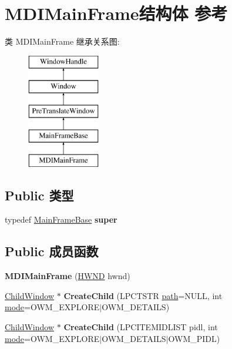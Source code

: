 \hypertarget{struct_m_d_i_main_frame}{}\section{M\+D\+I\+Main\+Frame结构体 参考}
\label{struct_m_d_i_main_frame}
类 M\+D\+I\+Main\+Frame 继承关系图\+:\begin{figure}[H]
\begin{center}
\leavevmode
\includegraphics[height=5.000000cm]{struct_m_d_i_main_frame}
\end{center}
\end{figure}
\subsection*{Public 类型}
\begin{DoxyCompactItemize}
\item 
\mbox{\label{struct_m_d_i_main_frame_ad071b28486f4e0756b0119e080d413d4}} 
typedef \hyperlink{struct_main_frame_base}{Main\+Frame\+Base} {\bfseries super}
\end{DoxyCompactItemize}
\subsection*{Public 成员函数}
\begin{DoxyCompactItemize}
\item 
\mbox{\label{struct_m_d_i_main_frame_af79d083a43b136dad05247039bc7c5e0}} 
{\bfseries M\+D\+I\+Main\+Frame} (\hyperlink{interfacevoid}{H\+W\+ND} hwnd)
\item 
\mbox{\label{struct_m_d_i_main_frame_acad505b5e3eea735699089e0fefae286}} 
\hyperlink{struct_child_window}{Child\+Window} $\ast$ {\bfseries Create\+Child} (L\+P\+C\+T\+S\+TR \hyperlink{structpath}{path}=N\+U\+LL, int \hyperlink{interfacevoid}{mode}=O\+W\+M\+\_\+\+E\+X\+P\+L\+O\+RE$\vert$O\+W\+M\+\_\+\+D\+E\+T\+A\+I\+LS)
\item 
\mbox{\label{struct_m_d_i_main_frame_ab5c37572188a6a450fa24c17f9090f63}} 
\hyperlink{struct_child_window}{Child\+Window} $\ast$ {\bfseries Create\+Child} (L\+P\+C\+I\+T\+E\+M\+I\+D\+L\+I\+ST pidl, int \hyperlink{interfacevoid}{mode}=O\+W\+M\+\_\+\+E\+X\+P\+L\+O\+RE$\vert$O\+W\+M\+\_\+\+D\+E\+T\+A\+I\+LS$\vert$O\+W\+M\+\_\+\+P\+I\+DL)
\end{DoxyCompactItemize}
